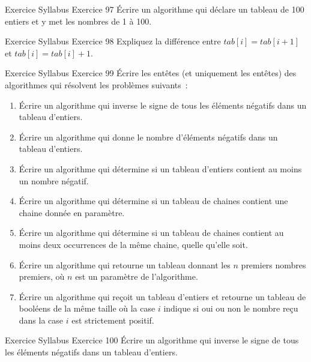 \begin{frame}{Exercice \theexercice}{Syllabus Exercice 97}
    Écrire un algorithme qui déclare un tableau de 100 entiers
    et y met les nombres de 1 à 100.
\end{frame}

\begin{frame}{Exercice \theexercice}{Syllabus Exercice 98}
    Expliquez la différence entre $tab[i] = tab[i+1]$
    et $tab[i] = tab[i]+1$.
\end{frame}

\begin{frame}{Exercice \theexercice}{Syllabus Exercice 99}
    Écrire les entêtes (et uniquement les entêtes)
    des algorithmes qui résolvent les problèmes suivants~:
    \begin{enumerate}
        \item
        Écrire un algorithme qui
        inverse le signe de tous les éléments négatifs dans un tableau d’entiers.
        \item
        Écrire un algorithme qui
        donne le nombre d’éléments négatifs dans un tableau d’entiers.
        \item
        Écrire un algorithme qui
        détermine si un tableau d’entiers contient au moins un nombre négatif.
        \item
        Écrire un algorithme qui
        détermine si un tableau de chaines contient
        une chaine donnée en paramètre.
        \item
        Écrire un algorithme qui
        détermine si un tableau de chaines contient
        au moins deux occurrences de la même chaine,
        quelle qu’elle soit.
        \item
        Écrire un algorithme qui
        retourne un tableau donnant les $n$ premiers nombres premiers,
        où $n$ est un paramètre de l’algorithme.
        \item
        Écrire un algorithme qui
        reçoit un tableau d’entiers
        et retourne un tableau de booléens de la même taille
        où la case $i$ indique si oui ou non
        le nombre reçu dans la case $i$ est strictement positif.
    \end{enumerate}
\end{frame}

\begin{frame}{Exercice \theexercice}{Syllabus Exercice 100}
    Écrire un algorithme qui
    inverse le signe de tous les éléments négatifs dans un tableau d’entiers.
\end{frame}

